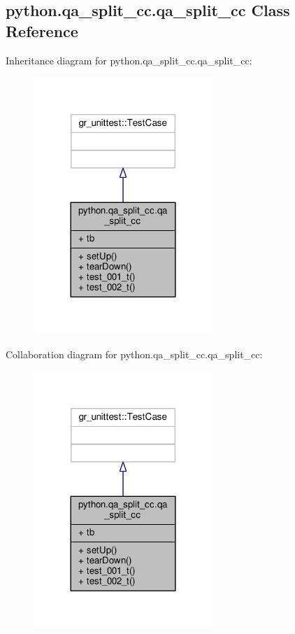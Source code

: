 \subsection{python.\+qa\+\_\+split\+\_\+cc.\+qa\+\_\+split\+\_\+cc Class Reference}
\label{classpython_1_1qa__split__cc_1_1qa__split__cc}


Inheritance diagram for python.\+qa\+\_\+split\+\_\+cc.\+qa\+\_\+split\+\_\+cc\+:
\nopagebreak
\begin{figure}[H]
\begin{center}
\leavevmode
\includegraphics[width=192pt]{d0/dcc/classpython_1_1qa__split__cc_1_1qa__split__cc__inherit__graph}
\end{center}
\end{figure}


Collaboration diagram for python.\+qa\+\_\+split\+\_\+cc.\+qa\+\_\+split\+\_\+cc\+:
\nopagebreak
\begin{figure}[H]
\begin{center}
\leavevmode
\includegraphics[width=192pt]{dd/df1/classpython_1_1qa__split__cc_1_1qa__split__cc__coll__graph}
\end{center}
\end{figure}
